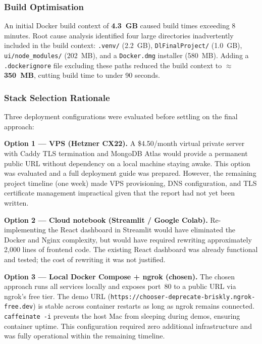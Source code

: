\documentclass[12pt, a4paper]{article}
\begin{document}
\subsubsection{Build Optimisation}

An initial Docker build context of \textbf{4.3~GB} caused build
times exceeding 8 minutes. Root cause analysis identified four
large directories inadvertently included in the build context:
\texttt{.venv/} (2.2~GB), \texttt{DlFinalProject/} (1.0~GB),
\texttt{ui/node\_modules/} (202~MB), and a \texttt{Docker.dmg}
installer (580~MB). Adding a \texttt{.dockerignore} file excluding
these paths reduced the build context to \textbf{$\approx$350~MB},
cutting build time to under 90 seconds.

\subsubsection{Stack Selection Rationale}

Three deployment configurations were evaluated before settling on
the final approach:

\textbf{Option 1 --- VPS (Hetzner CX22).}
A \$4.50/month virtual private server with Caddy TLS termination
and MongoDB Atlas would provide a permanent public URL without
dependency on a local machine staying awake. This option was
evaluated and a full deployment guide was prepared. However, the
remaining project timeline (one week) made VPS provisioning, DNS
configuration, and TLS certificate management impractical given
that the report had not yet been written.

\textbf{Option 2 --- Cloud notebook (Streamlit / Google Colab).}
Re-implementing the React dashboard in Streamlit would have
eliminated the Docker and Nginx complexity, but would have required
rewriting approximately 2,000 lines of frontend code. The existing
React dashboard was already functional and tested; the cost of
rewriting it was not justified.

\textbf{Option 3 --- Local Docker Compose + ngrok (chosen).}
The chosen approach runs all services locally and exposes port~80
to a public URL via ngrok's free tier. The demo URL
(\texttt{https://chooser-deprecate-briskly.ngrok-free.dev}) is
stable across container restarts as long as ngrok remains connected.
\texttt{caffeinate -i} prevents the host Mac from sleeping during
demos, ensuring container uptime. This configuration required zero
additional infrastructure and was fully operational within the
remaining timeline.
\end{document}
